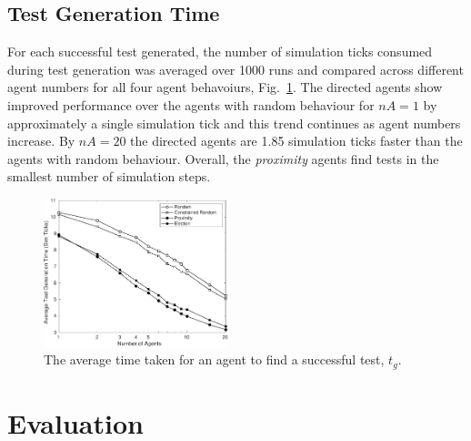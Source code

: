 \documentclass[letterpaper, 10 pt, journal, twoside]{IEEEtran}
\begin{document}
\subsection{Test Generation Time}
For each successful test generated, the number of simulation ticks consumed during test generation was averaged over 1000 runs and compared across different agent numbers for all four agent behavoiurs, Fig.~\ref{f:time}. 
%
The directed agents show improved performance over the agents with random behaviour for $nA=1$ by approximately a single simulation tick and this trend continues as agent numbers increase. By $nA=20$ the directed agents are 1.85 simulation ticks faster than the agents with random behaviour. Overall, the \textit{proximity} agents find tests in the smallest number of simulation steps.

\begin{figure}[!t]
	\centering
\includegraphics[width=0.48\textwidth]{TimeSimTicks.pdf}
	\caption{The average time taken for an agent to find a successful test, $t_{g}$.}
	\label{f:time}
\end{figure}




\section{Evaluation}\label{s:evaluation}
\end{document}
